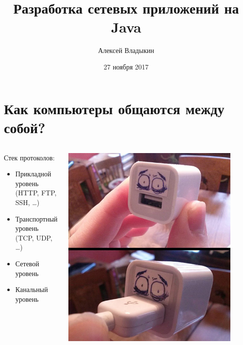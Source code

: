 \documentclass[unicode]{beamer}
\title[Разработка сетевых приложений]{Разработка сетевых приложений на Java}
\author{Алексей Владыкин}
\date{27 ноября 2017}
\begin{document}
\begin{frame}
\titlepage
\end{frame}

\begin{frame}
\tableofcontents
\end{frame}


\section{Как компьютеры общаются между собой?}

\begin{frame}
\begin{columns}
\begin{column}{0.6\textwidth}
Стек протоколов:
\begin{itemize}
\item Прикладной уровень\\(HTTP, FTP, SSH, \ldots)
\item Транспортный уровень\\(TCP, UDP, \ldots)
\item Сетевой уровень
\item Канальный уровень
\end{itemize}
\end{column}%
\begin{column}{0.4\textwidth}
\includegraphics[width=0.9\textwidth]{pics/socket.jpg}
\end{column}
\end{columns}
\end{frame}
\end{document}
